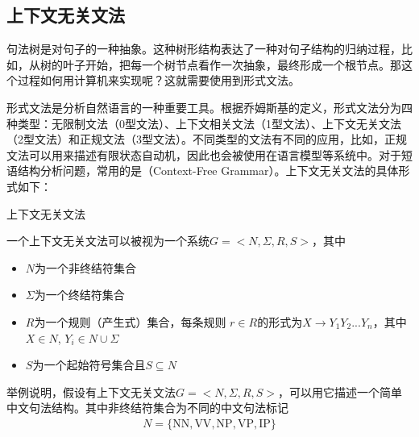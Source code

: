 \subsection{上下文无关文法}

\parinterval 句法树是对句子的一种抽象。这种树形结构表达了一种对句子结构的归纳过程，比如，从树的叶子开始，把每一个树节点看作一次抽象，最终形成一个根节点。那这个过程如何用计算机来实现呢？这就需要使用到形式文法。

\parinterval 形式文法是分析自然语言的一种重要工具。根据乔姆斯基的定义\cite{chomsky2002syntactic}，形式文法分为四种类型：无限制文法（0型文法）、上下文相关文法（1型文法）、上下文无关文法（2型文法）和正规文法（3型文法）。不同类型的文法有不同的应用，比如，正规文法可以用来描述有限状态自动机，因此也会被使用在语言模型等系统中。对于短语结构分析问题，常用的是{\small{}}（Context-Free Grammar）。上下文无关文法的具体形式如下：

\vspace{0.5em}
\begin{definition} 上下文无关文法

一个上下文无关文法可以被视为一个系统$G=<N,\Sigma,R,S>$，其中

\begin{itemize}
\vspace{0.5em}
\item $N$为一个非终结符集合
\vspace{0.5em}
\item $\Sigma$为一个终结符集合
\vspace{0.5em}
\item $R$为一个规则（产生式）集合，每条规则 $r \in R$的形式为$X \to Y_1Y_2...Y_n$，其中$X \in N$, $Y_i \in N \cup \Sigma$
\vspace{0.5em}
\item $S$为一个起始符号集合且$S \subseteq N$
\vspace{0.5em}
\end{itemize}
\end{definition}

\parinterval 举例说明，假设有上下文无关文法$G=<N,\Sigma,R,S>$，可以用它描述一个简单中文句法结构。其中非终结符集合为不同的中文句法标记
\begin{eqnarray}
N=\{\textrm{NN},\textrm{VV},\textrm{NP},\textrm{VP},\textrm{IP}\} \nonumber
\label{eq:2-42}
\end{eqnarray}

